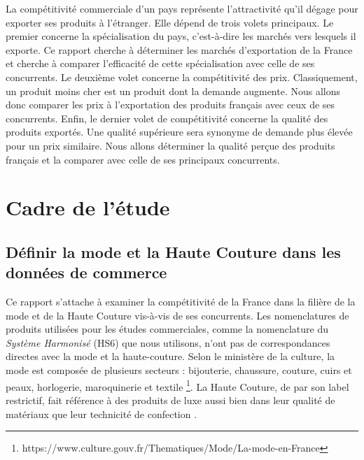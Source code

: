\documentclass[french,10pt,a4paper]{article}
\begin{document}
La compétitivité commerciale d'un pays représente l'attractivité qu'il dégage pour exporter ses produits à l'étranger. Elle dépend de trois volets principaux. Le premier concerne la spécialisation du pays, c'est-à-dire les marchés vers lesquels il exporte. Ce rapport cherche à déterminer les marchés d'exportation de la France et cherche à comparer l'efficacité de cette spécialisation avec celle de ses concurrents. Le deuxième volet concerne la compétitivité des prix. Classiquement, un produit moins cher est un produit dont la demande augmente. Nous allons donc comparer les prix à l'exportation des produits français avec ceux de ses concurrents. Enfin, le dernier volet de compétitivité concerne la qualité des produits exportés. Une qualité supérieure sera synonyme de demande plus élevée pour un prix similaire. Nous allons déterminer la qualité perçue des produits français et la comparer avec celle de ses principaux concurrents. 


\newpage

\section{Cadre de l'étude}

\subsection{Définir la mode et la Haute Couture dans les données de commerce}

Ce rapport s'attache à examiner la compétitivité de la France dans la filière de la mode et de la Haute Couture vis-à-vis de ses concurrents. Les nomenclatures de produits utilisées pour les études commerciales, comme la nomenclature du \textit{Système Harmonisé} (HS6) que nous utilisons, n'ont pas de correspondances directes avec la mode et la haute-couture. Selon le ministère de la culture, la mode est composée de plusieurs secteurs : bijouterie, chaussure, couture, cuirs et peaux, horlogerie, maroquinerie et textile \footnote{https://www.culture.gouv.fr/Thematiques/Mode/La-mode-en-France}. La Haute Couture, de par son label restrictif, fait référence à des produits de luxe aussi bien dans leur qualité de matériaux que leur technicité de confection \citep{Agogue2010}. 
\end{document}
